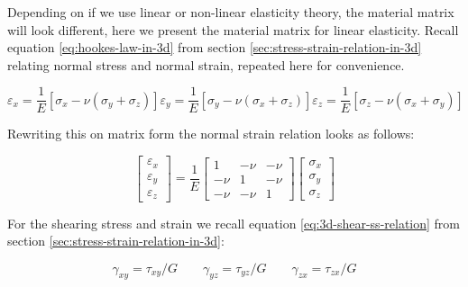 Depending on if we use linear or non-linear elasticity theory, the
material matrix will look different, here we present the material
matrix for linear elasticity. Recall equation
\eqref{eq:hookes-law-in-3d} from section
\vref{sec:stress-strain-relation-in-3d} relating normal stress and
normal strain, repeated here for convenience.

\begin{subequations}
\begin{equation*}
    \varepsilon_x = \frac {1}{E} \left [ \sigma_x - \nu \left (
        \sigma_y + \sigma_z \right ) \right ]
\end{equation*}
\begin{equation*} 
    \varepsilon_y = \frac {1}{E} \left [ \sigma_y - \nu \left (
        \sigma_x + \sigma_z \right ) \right ]  
\end{equation*}
\begin{equation*}
    \varepsilon_z = \frac {1}{E} \left [ \sigma_z - \nu \left (
        \sigma_x + \sigma_y \right ) \right ]  
\end{equation*}
\end{subequations}

Rewriting this on matrix form the normal strain relation looks as follows:

\begin{equation}
\begin{bmatrix}
\varepsilon_x \\ \varepsilon_y \\ \varepsilon_z
\end{bmatrix}
=
\frac{1}{E}
\begin{bmatrix}
  1 & - \nu & - \nu \\
  - \nu & 1 & - \nu \\
  - \nu & - \nu & 1
\end{bmatrix}
\begin{bmatrix}
  \sigma_x \\ \sigma_y \\ \sigma_z
\end{bmatrix}
\end{equation}

For the shearing stress and strain we recall equation
\eqref{eq:3d-shear-ss-relation} from section
\vref{sec:stress-strain-relation-in-3d}:

\begin{equation*}
  \gamma_{xy} = \tau_{xy} / G
  \qquad
  \gamma_{yz} = \tau_{yz} / G
  \qquad
  \gamma_{zx} = \tau_{zx} / G
\end{equation*}

